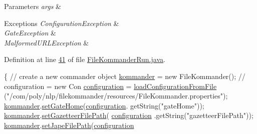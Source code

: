 \begin{DoxyParams}{Parameters}
{\em args} & \\
\hline
\end{DoxyParams}

\begin{DoxyExceptions}{Exceptions}
{\em Configuration\-Exception} & \\
\hline
{\em Gate\-Exception} & \\
\hline
{\em Malformed\-U\-R\-L\-Exception} & \\
\hline
\end{DoxyExceptions}


Definition at line \hyperlink{L41}{41} of file \hyperlink{}{File\-Kommander\-Run.\-java}.


\begin{DoxyCode}
                                                 \{
        \textcolor{comment}{// create a new commander object}
        \hyperlink{classcom_1_1poly_1_1nlp_1_1filekommander_1_1_file_kommander_run_a2dffc1b40df78c82faf9567da220dae2}{kommander} = \textcolor{keyword}{new} FileKommander();
        \textcolor{comment}{// configuration = new Con}
        \hyperlink{classcom_1_1poly_1_1nlp_1_1filekommander_1_1_file_kommander_run_a6bcf83454309db08057f32fde995ede8}{configuration} = \hyperlink{classcom_1_1poly_1_1nlp_1_1filekommander_1_1_file_kommander_run_a459b20955a8772b8de02853c3fae3695}{loadConfigurationFromFile}
      (\textcolor{stringliteral}{"/com/poly/nlp/filekommander/resources/FileKommander.properties"});
        \hyperlink{classcom_1_1poly_1_1nlp_1_1filekommander_1_1_file_kommander_run_a2dffc1b40df78c82faf9567da220dae2}{kommander}.\hyperlink{classcom_1_1poly_1_1nlp_1_1filekommander_1_1_file_kommander_a8481d268cb1ff04d24fd11e361ce0519}{setGateHome}(\hyperlink{classcom_1_1poly_1_1nlp_1_1filekommander_1_1_file_kommander_run_a6bcf83454309db08057f32fde995ede8}{configuration}.
      getString(\textcolor{stringliteral}{"gateHome"}));
        \hyperlink{classcom_1_1poly_1_1nlp_1_1filekommander_1_1_file_kommander_run_a2dffc1b40df78c82faf9567da220dae2}{kommander}.\hyperlink{classcom_1_1poly_1_1nlp_1_1filekommander_1_1_file_kommander_a1a5a67f1f2fd6c50682861ae3a2c445c}{setGazetteerFilePath}(
      \hyperlink{classcom_1_1poly_1_1nlp_1_1filekommander_1_1_file_kommander_run_a6bcf83454309db08057f32fde995ede8}{configuration}
                .getString(\textcolor{stringliteral}{"gazetteerFilePath"}));
        \hyperlink{classcom_1_1poly_1_1nlp_1_1filekommander_1_1_file_kommander_run_a2dffc1b40df78c82faf9567da220dae2}{kommander}.\hyperlink{classcom_1_1poly_1_1nlp_1_1filekommander_1_1_file_kommander_a84ad78f1592cfb94ab5199aa4f7fa29b}{setJapeFilePath}(\hyperlink{classcom_1_1poly_1_1nlp_1_1filekommander_1_1_file_kommander_run_a6bcf83454309db08057f32fde995ede8}{configuration}

\end{DoxyCode}
